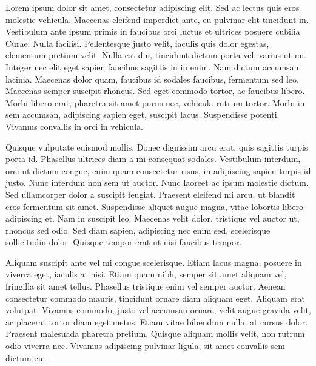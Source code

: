 \begin{multicols}{3}    %
Lorem ipsum dolor sit amet, consectetur adipiscing elit. Sed ac lectus quis eros molestie vehicula. Maecenas eleifend imperdiet ante, eu pulvinar elit tincidunt in. Vestibulum ante ipsum primis in faucibus orci luctus et ultrices posuere cubilia Curae; Nulla facilisi. Pellentesque justo velit, iaculis quis dolor egestas, elementum pretium velit. Nulla est dui, tincidunt dictum porta vel, varius ut mi. Integer nec elit eget sapien faucibus sagittis in in enim. Nam dictum accumsan lacinia. Maecenas dolor quam, faucibus id sodales faucibus, fermentum sed leo. Maecenas semper suscipit rhoncus. Sed eget commodo tortor, ac faucibus libero. Morbi libero erat, pharetra sit amet purus nec, vehicula rutrum tortor. Morbi in sem accumsan, adipiscing sapien eget, suscipit lacus. Suspendisse potenti. Vivamus convallis in orci in vehicula.

Quisque vulputate euismod mollis. Donec dignissim arcu erat, quis sagittis turpis porta id. Phasellus ultrices diam a mi consequat sodales. Vestibulum interdum, orci ut dictum congue, enim quam consectetur risus, in adipiscing sapien turpis id justo. Nunc interdum non sem ut auctor. Nunc laoreet ac ipsum molestie dictum. Sed ullamcorper dolor a suscipit feugiat. Praesent eleifend mi arcu, ut blandit eros fermentum sit amet. Suspendisse aliquet augue magna, vitae lobortis libero adipiscing et. Nam in suscipit leo. Maecenas velit dolor, tristique vel auctor ut, rhoncus sed odio. Sed diam sapien, adipiscing nec enim sed, scelerisque sollicitudin dolor. Quisque tempor erat ut nisi faucibus tempor.

Aliquam suscipit ante vel mi congue scelerisque. Etiam lacus magna, posuere in viverra eget, iaculis at nisi. Etiam quam nibh, semper sit amet aliquam vel, fringilla sit amet tellus. Phasellus tristique enim vel semper auctor. Aenean consectetur commodo mauris, tincidunt ornare diam aliquam eget. Aliquam erat volutpat. Vivamus commodo, justo vel accumsan ornare, velit augue gravida velit, ac placerat tortor diam eget metus. Etiam vitae bibendum nulla, at cursus dolor. Praesent malesuada pharetra pretium. Quisque aliquam mollis velit, non rutrum odio viverra nec. Vivamus adipiscing pulvinar ligula, sit amet convallis sem dictum eu.
\end{multicols}
